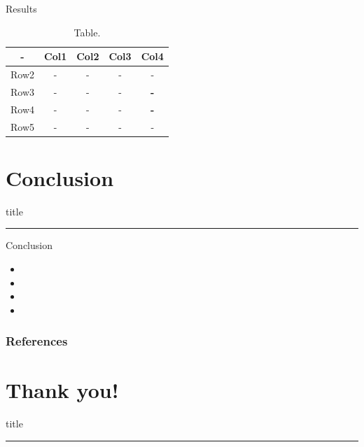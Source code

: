 \documentclass{beamer} %
\begin{document}
\begin{frame}{Results}
    
    \begin{table}
        \centering
        \begin{tabular}{|c|c|c|c|c|} \hline 
            - & Col1 & Col2 & Col3 & Col4\\ \hline 
            Row2 & - & - & - & -\\ \hline 
            Row3 & -& -& -& \textbf{-}\\ \hline 
            Row4 & -& -& -& \textbf{-}\\ \hline 
            Row5 & -& -& -& -\\ \hline
        \end{tabular}
        \caption{Table.}
        \label{tab:table1}
    \end{table}
\end{frame}

\section{Conclusion}
    \begin{frame}[plain]
        \vfill
      \centering
      \begin{beamercolorbox}[sep=8pt,center,shadow=true,rounded=true]{title}
        \insertsectionhead\par%
        \color{red}\noindent\rule{10cm}{1pt}
      \end{beamercolorbox}
      \vfill
  \end{frame}
  

\begin{frame}{Conclusion}
\begin{itemize}
    \item \lipsum[1][1]
    \item \lipsum[1][2]
    \item \lipsum[1][3]
    \item \lipsum[1][4]
\end{itemize}
\end{frame}


\begin{frame}[allowframebreaks]
        \frametitle{References}



\end{frame}

\section*{Thank you!}
    \begin{frame}[plain]
        \vfill
      \centering
      \begin{beamercolorbox}[sep=8pt,center,shadow=true,rounded=true]{title}
        \insertsectionhead\par%
        \color{red}\noindent\rule{10cm}{1pt}
      \end{beamercolorbox}
      \vfill
  \end{frame}
\end{document}
